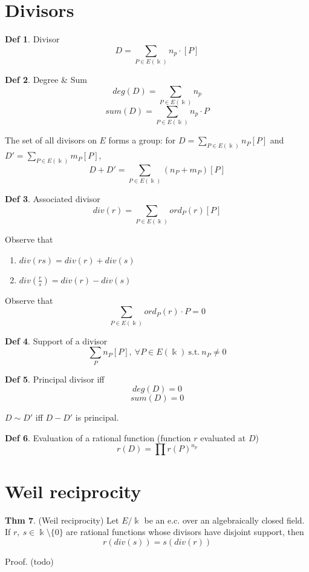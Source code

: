 \documentclass{article}
\theoremstyle{definition}
\newtheorem{definition}{Def}[section]
\newtheorem{theorem}[definition]{Thm}
\begin{document}
\section{Divisors}

\begin{definition}{Divisor}
  $$D= \sum_{P \in E(\Bbbk)} n_p \cdot [P]$$
\end{definition}

\begin{definition}{Degree \& Sum}
  $$deg(D)= \sum_{P \in E(\Bbbk)} n_p$$
  $$sum(D)= \sum_{P \in E(\Bbbk)} n_p \cdot P$$
\end{definition}


The set of all divisors on $E$ forms a group: for $D = \sum_{P\in E(\Bbbk)} n_P[P]$ and $D' = \sum_{P\in E(\Bbbk)} m_P[P]$,
$$D+D' = \sum_{P\in E(\Bbbk)} (n_P + m_P)[P]$$

\begin{definition}{Associated divisor}
  $$div(r) = \sum_{P \in E(\Bbbk)} ord_P(r)[P]$$
\end{definition}

Observe that
\begin{enumerate}
  \item[] $div(rs) = div(r)+div(s)$
  \item[] $div(\frac{r}{s}) = div(r)-div(s)$
\end{enumerate}

Observe that
$$\sum_{P \in E(\Bbbk)} ord_P(r) \cdot P = 0$$

\begin{definition}{Support of a divisor}
  $$\sum_P n_P[P], ~\forall P \in E(\Bbbk) ~\text{s.t.}~ n_P \neq 0$$
\end{definition}

\begin{definition}{Principal divisor}
  iff
  $$deg(D)=0$$
  $$sum(D)=0$$
\end{definition}
$D \sim D'$ iff $D - D'$ is principal.


\begin{definition}{Evaluation of a rational function} (function $r$ evaluated at $D$)
  $$r(D)= \prod r(P)^{n_p}$$
\end{definition}

\section{Weil reciprocity}
\begin{theorem}{(Weil reciprocity)}
  Let $E/ \Bbbk$ be an e.c. over an algebraically closed field. If $r,~s \in \Bbbk\setminus \{0\}$ are rational functions whose divisors have disjoint support, then
$$r(div(s)) = s(div(r))$$
\end{theorem}
Proof. (todo)
\end{document}
